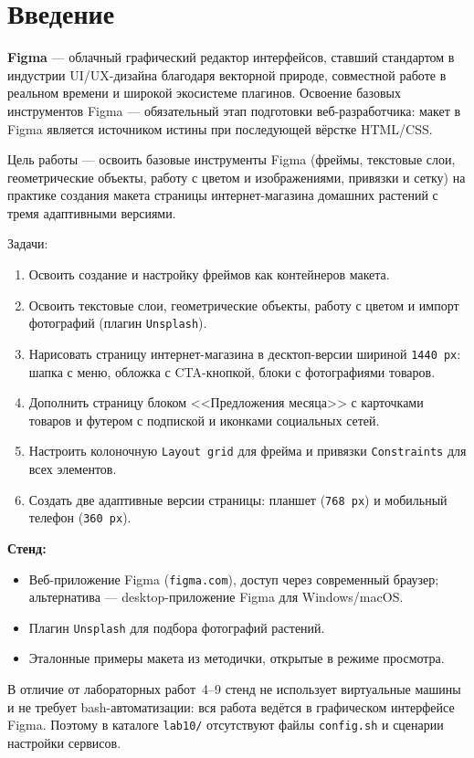 \chapter*{Введение}
\label{ch:intro}

\textbf{Figma} — облачный графический редактор интерфейсов, ставший стандартом в
индустрии UI/UX-дизайна благодаря векторной природе, совместной работе в реальном
времени и широкой экосистеме плагинов. Освоение базовых инструментов Figma —
обязательный этап подготовки веб-разработчика: макет в Figma является источником
истины при последующей вёрстке HTML/CSS.

Цель работы — освоить базовые инструменты Figma (фреймы, текстовые слои,
геометрические объекты, работу с цветом и изображениями, привязки и сетку)
на практике создания макета страницы интернет-магазина домашних растений
с тремя адаптивными версиями.

Задачи:
\begin{enumerate}
  \item Освоить создание и настройку фреймов как контейнеров макета.
  \item Освоить текстовые слои, геометрические объекты, работу с цветом
        и импорт фотографий (плагин \texttt{Unsplash}).
  \item Нарисовать страницу интернет-магазина в десктоп-версии шириной
        \texttt{1440\,px}: шапка с меню, обложка с CTA-кнопкой, блоки с
        фотографиями товаров.
  \item Дополнить страницу блоком <<Предложения месяца>> с карточками товаров
        и футером с подпиской и иконками социальных сетей.
  \item Настроить колоночную \texttt{Layout grid} для фрейма и привязки
        \texttt{Constraints} для всех элементов.
  \item Создать две адаптивные версии страницы: планшет (\texttt{768\,px}) и
        мобильный телефон (\texttt{360\,px}).
\end{enumerate}

\textbf{Стенд:}
\begin{itemize}
  \item Веб-приложение Figma (\texttt{figma.com}), доступ через современный
        браузер; альтернатива — desktop-приложение Figma для Windows/macOS.
  \item Плагин \texttt{Unsplash} для подбора фотографий растений.
  \item Эталонные примеры макета из методички, открытые в режиме просмотра.
\end{itemize}

В отличие от лабораторных работ~4--9 стенд не использует виртуальные машины
и не требует bash-автоматизации: вся работа ведётся в графическом интерфейсе
Figma. Поэтому в каталоге \texttt{lab10/} отсутствуют файлы \texttt{config.sh}
и сценарии настройки сервисов.

\endinput
